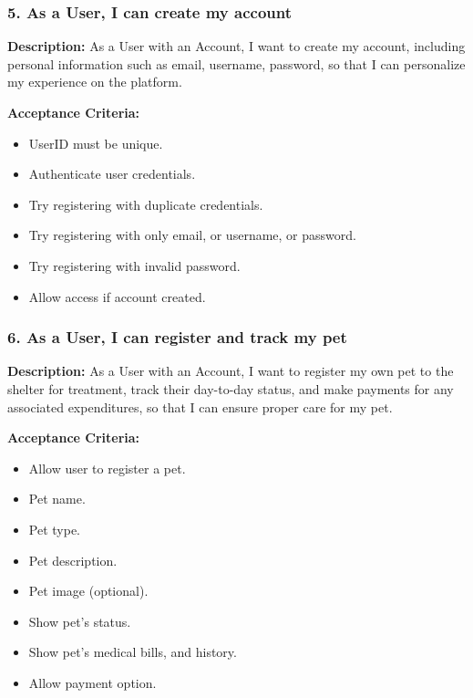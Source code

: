 \subsubsection*{5. As a User, I can create my account} 
    
    \textbf{Description:} As a User with an Account, I want to create my account, including personal information such as email, username, password, so that I can personalize my experience on the platform. 
    
    \textbf{Acceptance Criteria:}
    \begin{itemize}
       \item UserID must be unique.
       \item Authenticate user credentials.
       \item Try registering with duplicate credentials.
       \item Try registering with only email, or username, or password.
       \item Try registering with invalid password.
       \item Allow access if account created.
    \end{itemize}

\subsubsection*{6. As a User, I can register and track my pet} 
     
    \textbf{Description:} As a User with an Account, I want to register my own pet to the shelter for treatment, track their day-to-day status, and make payments for any associated expenditures, so that I can ensure proper care for my pet. 
    
    \textbf{Acceptance Criteria:}
    \begin{itemize}
       \item Allow user to register a pet. \vspace*{-1mm}
       \item Pet name. \vspace*{-1mm}
       \item Pet type. \vspace*{-1mm}
       \item Pet description. \vspace*{-1mm}
       \item Pet image (optional). \vspace*{-1mm}
       \item Show pet's status. \vspace*{-1mm}
       \item Show pet's medical bills, and history. \vspace*{-1mm}
       \item Allow payment option. \vspace*{-1mm}
    \end{itemize}

